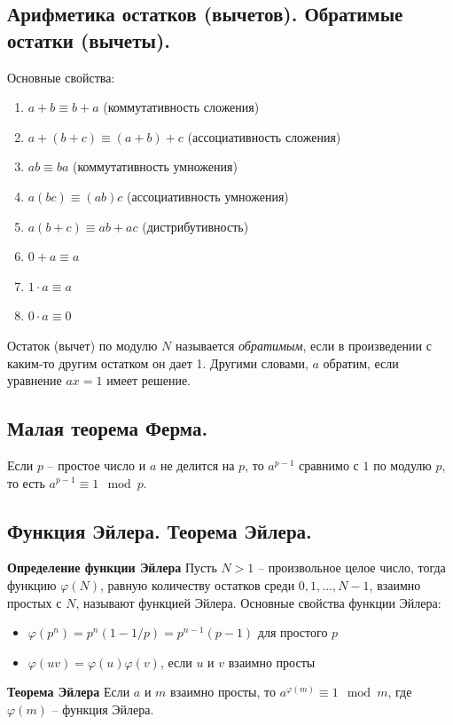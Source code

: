 \documentclass{article}
\begin{document}
\begin{samepage}
\subsection{Арифметика остатков (вычетов). Обратимые остатки (вычеты).} 
Основные свойства:
\begin{enumerate}
    \item $a + b \equiv b + a$ (коммутативность сложения)
    \item $a + (b + c) \equiv (a + b) + c$ (ассоциативность сложения)
    \item $ab \equiv ba$ (коммутативность умножения)
    \item $a(bc) \equiv (ab)c$ (ассоциативность умножения)
    \item $a(b + c) \equiv ab + ac$ (дистрибутивность)
    \item $0+a \equiv a$
    \item $1 \cdot a \equiv a$
    \item $0 \cdot a \equiv 0$
\end{enumerate}
Остаток (вычет) по модулю $N$ называется \textit{обратимым}, если в произведении с каким-то другим остатком он дает 1. Другими словами, $a$ обратим, если уравнение $ax = 1$  имеет решение.
\end{samepage}
\subsection{Малая теорема Ферма.}
Если $p$ -- простое число и $a$ не делится на $p$, то $a^{p-1}$ сравнимо с $1$ по модулю $p$, то есть $a^{p-1} \equiv 1 \mod{p}$.


\subsection{Функция Эйлера. Теорема Эйлера.}
\textbf{Определение функции Эйлера} \newline
Пусть $N > 1$ -- произвольное целое число, тогда функцию $\varphi(N)$, равную количеству остатков среди $0,1,...,N-1$, взаимно простых с $N$, называют функцией Эйлера.
\newline
Основные свойства функции Эйлера:
\begin{itemize}
    \item $\varphi(p^n) = p^n(1-1/p) = p^{n-1}(p - 1)$ для простого $p$
    \item $\varphi(uv) = \varphi(u)\varphi(v)$, если $u$ и $v$ взаимно просты
\end{itemize}
\textbf{Теорема Эйлера} \newline
Если $a$ и $m$ взаимно просты, то $a^{\varphi(m)} \equiv 1 \mod{m}$, где $\varphi(m)$ -- функция Эйлера.
\end{document}
